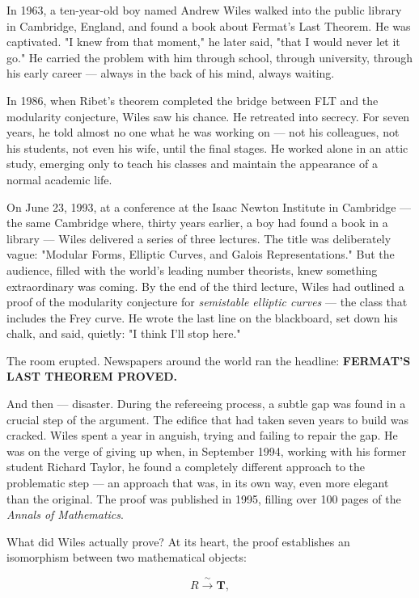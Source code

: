 \documentclass[11pt,openany]{book}
\theoremstyle{definition}
\theoremstyle{plain}
\theoremstyle{remark}
\begin{document}
In 1963, a ten-year-old boy named Andrew Wiles walked into the public library in Cambridge, England, and found a book about Fermat's Last Theorem. He was captivated. "I knew from that moment," he later said, "that I would never let it go." He carried the problem with him through school, through university, through his early career — always in the back of his mind, always waiting.

In 1986, when Ribet's theorem completed the bridge between FLT and the modularity conjecture, Wiles saw his chance. He retreated into secrecy. For seven years, he told almost no one what he was working on — not his colleagues, not his students, not even his wife, until the final stages. He worked alone in an attic study, emerging only to teach his classes and maintain the appearance of a normal academic life.

On June 23, 1993, at a conference at the Isaac Newton Institute in Cambridge — the same Cambridge where, thirty years earlier, a boy had found a book in a library — Wiles delivered a series of three lectures. The title was deliberately vague: "Modular Forms, Elliptic Curves, and Galois Representations." But the audience, filled with the world's leading number theorists, knew something extraordinary was coming. By the end of the third lecture, Wiles had outlined a proof of the modularity conjecture for \textit{semistable elliptic curves} — the class that includes the Frey curve. He wrote the last line on the blackboard, set down his chalk, and said, quietly: "I think I'll stop here."

The room erupted. Newspapers around the world ran the headline: \textbf{FERMAT'S LAST THEOREM PROVED.}

And then — disaster. During the refereeing process, a subtle gap was found in a crucial step of the argument. The edifice that had taken seven years to build was cracked. Wiles spent a year in anguish, trying and failing to repair the gap. He was on the verge of giving up when, in September 1994, working with his former student Richard Taylor, he found a completely different approach to the problematic step — an approach that was, in its own way, even more elegant than the original. The proof was published in 1995, filling over 100 pages of the \textit{Annals of Mathematics}.

What did Wiles actually prove? At its heart, the proof establishes an isomorphism between two mathematical objects:

$$R \xrightarrow{\;\sim\;} \mathbf{T},$$
\end{document}
